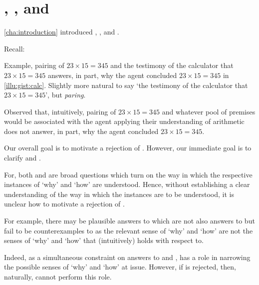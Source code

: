 \section{\qWhy{}, \qHow{}, and \issueInclusion{}}
\label{sec:variations-qwhy-qhow}

\begin{note}
  \autoref{cha:introduction} introduced \qWhy{}, \qHow{}, and \issueInclusion{}.

  Recall:
  \vspace{-\baselineskip}
  \begin{quote}
    \questionWhyBasic*
  \end{quote}

  \begin{quote}
    \questionHowBasic*
  \end{quote}

  \begin{quote}
    \issueInclusionFirst*
  \end{quote}
\end{note}

\begin{note}
    Example, pairing of \(23 \times 15 = 345\) and the testimony of the calculator that \(23 \times 15 = 345\) answers, in part, why the agent concluded \(23 \times 15 = 345\) in \autoref{illu:gist:calc}.
    Slightly more natural to say `the testimony of the calculator that \(23 \times 15 = 345\)', but \emph{paring}.

    Observed that, intuitively, pairing of \(23 \times 15 = 345\) and whatever pool of premises would be associated with the agent applying their understanding of arithmetic does not answer, in part, why the agent concluded \(23 \times 15 = 345\).
\end{note}

\begin{note}
  Our overall goal is to motivate a rejection of \issueInclusion{}.
  However, our immediate goal is to clarify \qWhy{} and \qHow{}.

  For, both \qWhy{} and \qHow{} are broad questions which turn on the way in which the respective instances of `why' and `how' are understood.
  Hence, without establishing a clear understanding of the way in which the instances are to be understood, it is unclear how to motivate a rejection of \issueInclusion{}.

  For example, there may be plausible answers to \qWhy{} which are not also answers to \qHow{} but fail to be counterexamples to \issueInclusion{} as the relevant sense of `why' and `how' are not the senses of `why' and `how' that \issueInclusion{} (intuitively) holds with respect to.

  Indeed, as a simultaneous constraint on answers to \qWhy{} and \qHow{}, \issueInclusion{} has a role in narrowing the possible senses of `why' and `how' at issue.
  However, if \issueInclusion{} is rejected, then, naturally, \issueInclusion{} cannot perform this role.
\end{note}

